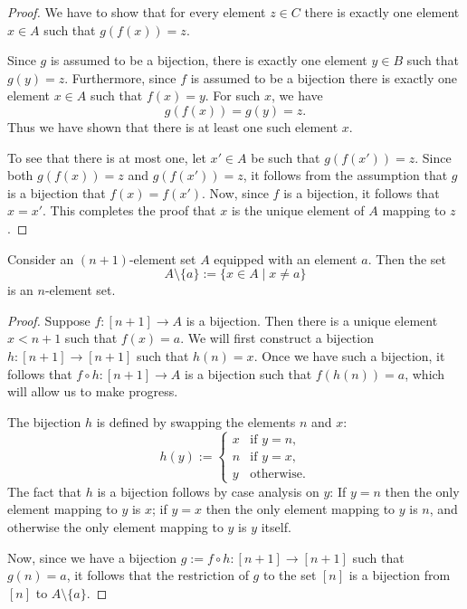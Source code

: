 \begin{proof}
  We have to show that for every element $z\in C$ there is exactly one element $x\in A$ such that $g(f(x))=z$.

  Since $g$ is assumed to be a bijection, there is exactly one element $y\in B$ such that $g(y)=z$. Furthermore, since $f$ is assumed to be a bijection there is exactly one element $x\in A$ such that $f(x)=y$. For such $x$, we have
  \begin{equation*}
    g(f(x))=g(y)=z.
  \end{equation*}
  Thus we have shown that there is at least one such element $x$.

  To see that there is at most one, let $x'\in A$ be such that $g(f(x'))=z$. Since both $g(f(x))=z$ and $g(f(x'))=z$, it follows from the assumption that $g$ is a bijection that $f(x)=f(x')$. Now, since $f$ is a bijection, it follows that $x=x'$. This completes the proof that $x$ is the unique element of $A$ mapping to $z$.
\end{proof}

\begin{lemma}
  Consider an $(n+1)$-element set $A$ equipped with an element $a$. Then the set
  \begin{equation*}
    A\setminus\{a\}:=\{x\in A\mid x\neq a\}
  \end{equation*}
  is an $n$-element set.
\end{lemma}

\begin{proof}
  Suppose $f:[n+1]\to A$ is a bijection. Then there is a unique element $x<n+1$ such that $f(x)=a$. We will first construct a bijection $h:[n+1]\to[n+1]$ such that $h(n)=x$. Once we have such a bijection, it follows that $f\circ h:[n+1]\to A$ is a bijection such that $f(h(n))=a$, which will allow us to make progress.

  The bijection $h$ is defined by swapping the elements $n$ and $x$:
  \begin{equation*}
    h(y) :=
    \begin{cases}
      x & \text{if $y=n$},\\
      n & \text{if $y=x$},\\
      y & \text{otherwise}.
    \end{cases}
  \end{equation*}
  The fact that $h$ is a bijection follows by case analysis on $y$: If $y=n$ then the only element mapping to $y$ is $x$; if $y=x$ then the only element mapping to $y$ is $n$, and otherwise the only element mapping to $y$ is $y$ itself.

  Now, since we have a bijection $g:=f\circ h:[n+1]\to[n+1]$ such that $g(n)=a$, it follows that the restriction of $g$ to the set $[n]$ is a bijection from $[n]$ to $A\setminus\{a\}$.
\end{proof}

